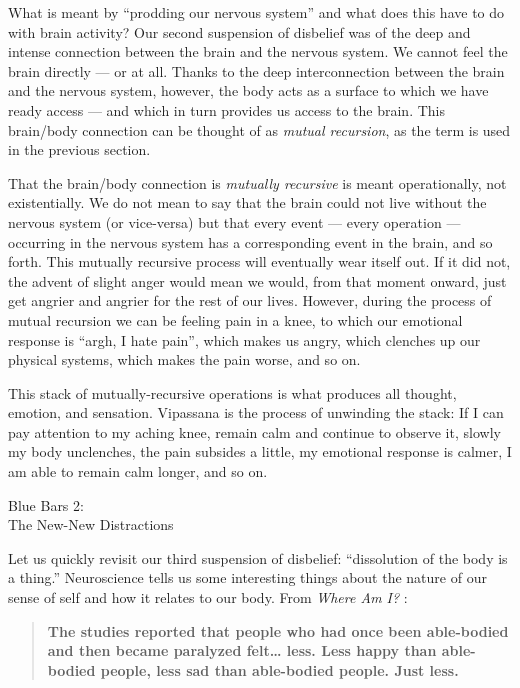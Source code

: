 \documentclass{article}
\begin{document}
What is meant by ``prodding our nervous system'' and what does this have to do with brain activity? Our second suspension of disbelief was of the deep and intense connection between the brain and the nervous system. We cannot feel the brain directly --- or at all. Thanks to the deep interconnection between the brain and the nervous system, however, the body acts as a surface to which we have ready access --- and which in turn provides us access to the brain. This brain/body connection can be thought of as \textit{mutual recursion}, as the term is used in the previous section.

That the brain/body connection is \textit{mutually recursive} is meant operationally, not existentially. We do not mean to say that the brain could not live without the nervous system (or vice-versa) but that every event --- every operation --- occurring in the nervous system has a corresponding event in the brain, and so forth. This mutually recursive process will eventually wear itself out. If it did not, the advent of slight anger would mean we would, from that moment onward, just get angrier and angrier for the rest of our lives. However, during the process of mutual recursion we can be feeling pain in a knee, to which our emotional response is ``argh, I hate pain'', which makes us angry, which clenches up our physical systems, which makes the pain worse, and so on.

This stack of mutually-recursive operations is what produces all thought, emotion, and sensation. Vipassana is the process of unwinding the stack: If I can pay attention to my aching knee, remain calm and continue to observe it, slowly my body unclenches, the pain subsides a little, my emotional response is calmer, I am able to remain calm longer, and so on.


\pagebreak

\begin{center}
  \Huge{Blue Bars 2:}\\
  \Huge{The New-New Distractions}
\end{center}

Let us quickly revisit our third suspension of disbelief: ``dissolution of the body is a thing.'' Neuroscience tells us some interesting things about the nature of our sense of self and how it relates to our body. From \textit{Where Am I?} \cite{whereami}:

\begin{quote}
  \textbf{The studies reported that people who had once been able-bodied and then became paralyzed felt… less. Less happy than able-bodied people, less sad than able-bodied people. Just less.}
\end{quote}
\end{document}
